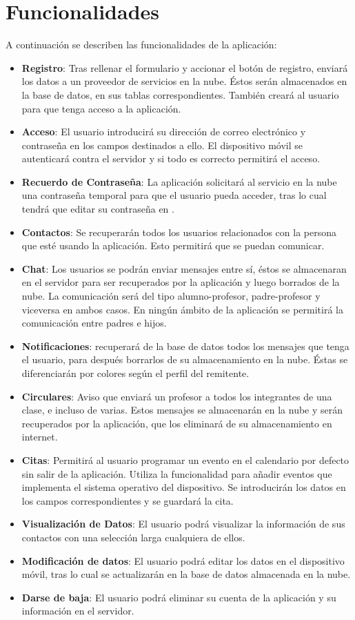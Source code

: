 	\section{Funcionalidades}
		A continuación se describen las funcionalidades de la aplicación:
		\begin{itemize} 
			\item {\bf Registro}: Tras rellenar el formulario y accionar el botón de registro, \CollegeApp enviará los datos a un proveedor de servicios en la nube. Éstos serán almacenados en la base de datos, en sus tablas correspondientes. También creará al usuario para que tenga acceso a la aplicación.
			\item {\bf Acceso}: El usuario introducirá su dirección de correo electrónico y contraseña en los campos destinados a ello. El dispositivo móvil se autenticará contra el servidor y si todo es correcto permitirá el acceso.
			\item {\bf Recuerdo de Contraseña}: La aplicación solicitará al servicio en la nube una contraseña temporal para que el usuario pueda acceder, tras lo cual tendrá que editar su contraseña en \CollegeApp.
			\item {\bf Contactos}: Se recuperarán todos los usuarios relacionados con la persona que esté usando la aplicación. Esto permitirá que se puedan comunicar.
			\item {\bf Chat}: Los usuarios se podrán enviar mensajes entre sí, éstos se almacenaran en el servidor para ser recuperados por la aplicación y luego borrados de la nube. La comunicación será del tipo alumno-profesor, padre-profesor y viceversa en ambos casos. En ningún ámbito de la aplicación se permitirá la comunicación entre padres e hijos.
			\item {\bf Notificaciones}: \CollegeApp recuperará de la base de datos todos los mensajes que tenga el usuario, para después borrarlos de su almacenamiento en la nube. Éstas se diferenciarán por colores según el perfil del remitente.
			\item {\bf Circulares}: Aviso que enviará un profesor a todos los integrantes de una clase, e incluso de varias. Estos mensajes se almacenarán en la nube y serán recuperados por la aplicación, que los eliminará de su almacenamiento en internet.
			\item {\bf Citas}: Permitirá al usuario programar un evento en el calendario por defecto sin salir de la aplicación. Utiliza la funcionalidad para añadir eventos que implementa el sistema operativo\cite{5:os:online} del dispositivo. Se introducirán los datos en los campos correspondientes y se guardará la cita.
			\item {\bf Visualización de Datos}: El usuario podrá visualizar la información de sus contactos con una selección larga cualquiera de ellos.
			\item {\bf Modificación de datos}: El usuario podrá editar los datos en el dispositivo móvil, tras lo cual se actualizarán en la base de datos almacenada en la nube. 
			\item {\bf Darse de baja}: El usuario podrá eliminar su cuenta de la aplicación y su información en el servidor.
		\end{itemize}

